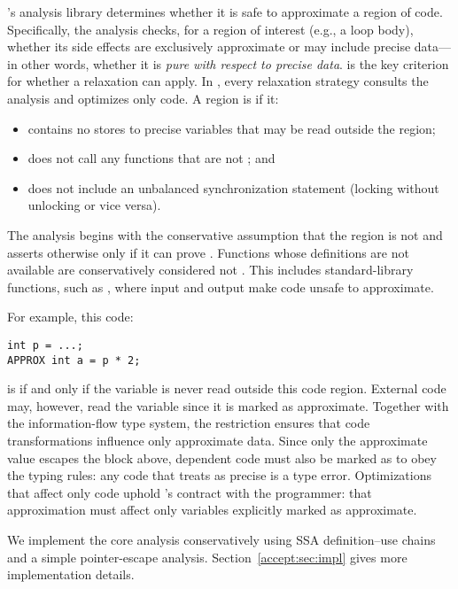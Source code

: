 \sysname's analysis library determines whether it is safe to approximate a
region of code.
Specifically, the \precisepurity analysis checks,
for a region of interest (e.g., a loop body), whether its side
effects are exclusively approximate or may include precise data---in other
words, whether it is \emph{pure with respect to precise data}.
%
\Precisepurity is the key criterion for whether a relaxation can
apply.  In
\sysname, every relaxation strategy consults the \precisepurity
analysis and optimizes only
\precisepure code.
%
A region is \precisepure if it:
\begin{itemize}
\item contains no stores to precise
variables that may be read outside the region;
\item does not call any functions that are not \precisepure; and
\item does not include an unbalanced synchronization statement (locking without
unlocking or vice versa).
\end{itemize}
The analysis begins with the conservative
assumption that the region is not \precisepure and asserts otherwise only if it
can prove \precisepurity.
Functions whose definitions are not available are conservatively considered
not \precisepure.
This includes standard-library functions, such as , where input
and output make code unsafe to approximate.

For example, this code:
%
\begin{lstlisting}
int p = ...;
APPROX int a = p * 2;
\end{lstlisting}
%
is \precisepure if and only if the variable  is never read outside this
code region. External code may, however, read the variable  since it is
marked as approximate.
%
Together with the information-flow type system, the \precisepurity restriction
ensures that code transformations influence only approximate data.
Since only the approximate value  escapes the \precisepure block above,
dependent code must also be marked as  to obey the typing rules:
any code that treats  as precise is a type error.
Optimizations that affect only \precisepure code uphold \sysname's
contract with the programmer: that approximation must affect only variables
explicitly marked as approximate.

We implement the core \precisepurity analysis
conservatively using SSA definition--use chains and a simple pointer-escape
analysis.  Section~\ref{accept:sec:impl} gives more implementation details.

